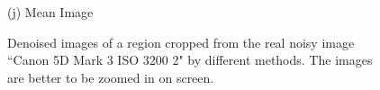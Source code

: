 \documentclass[10pt,onecolumn,letterpaper]{article}
\begin{document}
\begin{figure}
{\begin{minipage}[t]{0.195\textwidth}
{\footnotesize (j) Mean Image \cite{crosschannel2016}}
\end{minipage}
}
\caption{Denoised images of a region cropped from the real noisy image ``Canon 5D Mark 3 ISO 3200 2" \cite{crosschannel2016} by different methods. The images are better to be zoomed in on screen.}
\label{fig5}
\end{figure}


\begin{figure}\vspace{3mm}
\centering
{}
\end{figure}
\end{document}
